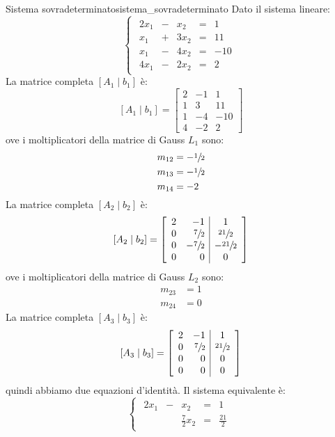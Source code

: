 \documentclass[12pt]{report}
\newcommand{\nmu}{}
\begin{document}
\begin{example}{\nmu Sistema sovradeterminato}{sistema_sovradeterminato}
Dato il sistema lineare:
\[
\begin{cases}
	\begin{array}{rcrcr}
	2x_1 & - & x_2 & = & 1 \\
	x_1 & + & 3x_2 & = & 11 \\
	x_1 & - & 4x_2 & = & -10 \\
	4x_1 & - & 2x_2 & = & 2
	\end{array}
\end{cases}
\]
La matrice completa $[A_1 \mid b_1]$ è:
\[
[A_1 \mid b_1] = \left[
	\begin{array}{rr|c}
	2 & -1 & 1 \\
	1 & 3 & 11 \\
	1 & -4 & -10 \\
	4 & -2 & 2
	\end{array}
\right]
\]
ove i moltiplicatori della matrice di Gauss $L_1$ sono:
\begin{align*}
	m_{12} &= -\sfrac{1}{2} \\
	m_{13} &= -\sfrac{1}{2} \\
	m_{14} &= -2
\end{align*}
La matrice completa $[A_2 \mid b_2]$ è:
\[
[A_2 \mid b_2] = \left[
\begin{array}{rr|c}
2 & -1 & 1 \\
0 & \sfrac{7}{2} & \sfrac{21}{2} \\
0 & -\sfrac{7}{2} & -\sfrac{21}{2} \\
0 & 0 & 0
\end{array}
\right]
\]
ove i moltiplicatori della matrice di Gauss $L_2$ sono:
\begin{align*}
	m_{23} &= 1 \\
	m_{24} &= 0
\end{align*}
La matrice completa $[A_3 \mid b_3]$ è:
\[
[A_3 \mid b_3] = \left[
\begin{array}{rr|c}
2 & -1 & 1 \\
0 & \sfrac{7}{2} & \sfrac{21}{2} \\
0 & 0 & 0 \\
0 & 0 & 0
\end{array}
\right]
\]
quindi abbiamo due equazioni d'identità. Il sistema equivalente è:
\[
\begin{cases}
	\begin{array}{rcrcr}
	2x_1 & - & x_2 & = & 1 \\
	& & \frac{7}{2}x_2 & = & \frac{21}{2}
	\end{array}

\end{cases}\]
\end{example}
\end{document}
